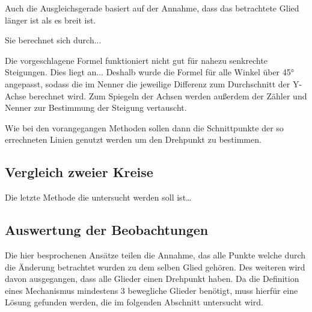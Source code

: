 

Auch die Ausgleichsgerade basiert auf der Annahme, dass das betrachtete Glied länger ist als es breit ist.

Sie berechnet sich durch... %

Die vorgeschlagene Formel funktioniert nicht gut für nahezu senkrechte Steigungen.
Dies liegt an... %
Deshalb wurde die Formel für alle Winkel über 45° angepasst, sodass die im Nenner die jeweilige Differenz zum Durchschnitt der Y-Achse berechnet wird.
Zum Spiegeln der Achsen werden außerdem der Zähler und Nenner zur Bestimmung der Steigung vertauscht.


Wie bei den vorangegangen Methoden sollen dann die Schnittpunkte der so errechneten Linien genutzt werden um den Drehpunkt zu bestimmen.

\subsection{Vergleich zweier Kreise}

Die letzte Methode die untersucht werden soll ist\dots

\subsection{Auswertung der Beobachtungen}


Die hier besprochenen Ansätze teilen die Annahme, das alle Punkte welche durch die Änderung betrachtet wurden zu dem selben Glied gehören.
Des weiteren wird davon ausgegangen, dass alle Glieder einen Drehpunkt haben.
Da die Definition eines Mechanismus mindestens 3 bewegliche Glieder benötigt, muss hierfür eine Lösung gefunden werden, die im folgenden Abschnitt untersucht wird.

